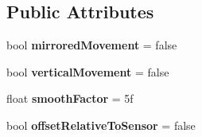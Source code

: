 \subsection*{Public Attributes}
\begin{DoxyCompactItemize}
\item 
\mbox{\label{class_avatar_controller_ae4b12583a22d820211b93b27c0f4019c}} 
bool {\bfseries mirrored\+Movement} = false
\item 
\mbox{\label{class_avatar_controller_ad879ee9629b94cb1c4feaacda6469ba5}} 
bool {\bfseries vertical\+Movement} = false
\item 
\mbox{\label{class_avatar_controller_a7a321f1989438d0a77848636a04c4bb5}} 
float {\bfseries smooth\+Factor} = 5f
\item 
\mbox{\label{class_avatar_controller_aa379013fbfd748dc0ccd9ffedfb759d2}} 
bool {\bfseries offset\+Relative\+To\+Sensor} = false
\end{DoxyCompactItemize}
